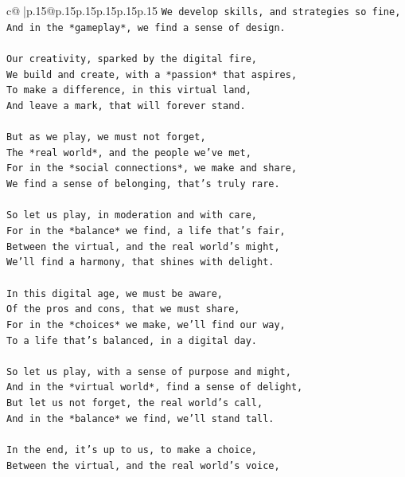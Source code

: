 \documentclass{article}
\begin{document}
{\begin{supertabular}{c@{$\;$}|p{.15\linewidth}@{}p{.15\linewidth}p{.15\linewidth}p{.15\linewidth}p{.15\linewidth}p{.15\linewidth}}
{{{\texttt{We develop skills, and strategies so fine,} \\
\texttt{And in the *gameplay*, we find a sense of design.} \\
\\ 
\texttt{Our creativity, sparked by the digital fire,} \\
\texttt{We build and create, with a *passion* that aspires,} \\
\texttt{To make a difference, in this virtual land,} \\
\texttt{And leave a mark, that will forever stand.} \\
\\ 
\texttt{But as we play, we must not forget,} \\
\texttt{The *real world*, and the people we've met,} \\
\texttt{For in the *social connections*, we make and share,} \\
\texttt{We find a sense of belonging, that's truly rare.} \\
\\ 
\texttt{So let us play, in moderation and with care,} \\
\texttt{For in the *balance* we find, a life that's fair,} \\
\texttt{Between the virtual, and the real world's might,} \\
\texttt{We'll find a harmony, that shines with delight.} \\
\\ 
\texttt{In this digital age, we must be aware,} \\
\texttt{Of the pros and cons, that we must share,} \\
\texttt{For in the *choices* we make, we'll find our way,} \\
\texttt{To a life that's balanced, in a digital day.} \\
\\ 
\texttt{So let us play, with a sense of purpose and might,} \\
\texttt{And in the *virtual world*, find a sense of delight,} \\
\texttt{But let us not forget, the real world's call,} \\
\texttt{And in the *balance* we find, we'll stand tall.} \\
\\ 
\texttt{In the end, it's up to us, to make a choice,} \\
\texttt{Between the virtual, and the real world's voice,} \\
}}}
\end{supertabular}}
\end{document}
